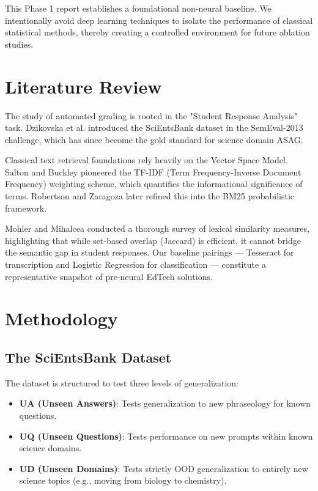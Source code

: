 \documentclass[conference]{IEEEtran}
\begin{document}
This Phase 1 report establishes a foundational non-neural baseline. We intentionally avoid deep learning techniques to isolate the performance of classical statistical methods, thereby creating a controlled environment for future ablation studies.

\section{Literature Review}
The study of automated grading is rooted in the "Student Response Analysis" task. Dzikovska et al. \cite{dzikovska2013} introduced the SciEntsBank dataset in the SemEval-2013 challenge, which has since become the gold standard for science domain ASAG.

Classical text retrieval foundations rely heavily on the Vector Space Model. Salton and Buckley \cite{salton1988} pioneered the TF-IDF (Term Frequency-Inverse Document Frequency) weighting scheme, which quantifies the informational significance of terms. Robertson and Zaragoza \cite{robertson2009} later refined this into the BM25 probabilistic framework.

Mohler and Mihalcea \cite{mohler2009} conducted a thorough survey of lexical similarity measures, highlighting that while set-based overlap (Jaccard) is efficient, it cannot bridge the semantic gap in student responses. Our baseline pairings — Tesseract \cite{smith2007} for transcription and Logistic Regression for classification — constitute a representative snapshot of pre-neural EdTech solutions.

\section{Methodology}
\subsection{The SciEntsBank Dataset}
The dataset is structured to test three levels of generalization:
\begin{itemize}
    \item \textbf{UA (Unseen Answers)}: Tests generalization to new phraseology for known questions.
    \item \textbf{UQ (Unseen Questions)}: Tests performance on new prompts within known science domains.
    \item \textbf{UD (Unseen Domains)}: Tests strictly OOD generalization to entirely new science topics (e.g., moving from biology to chemistry).
\end{itemize}
\end{document}
